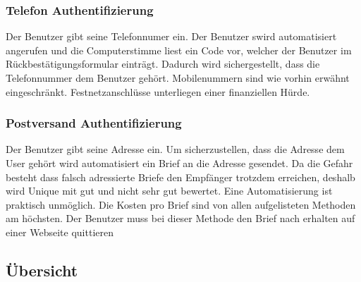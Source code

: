 \subsubsection{Telefon
Authentifizierung}\label{telefon-authentifizierung}

Der Benutzer gibt seine Telefonnumer ein. Der Benutzer swird
automatisiert angerufen und die Computerstimme liest ein Code vor,
welcher der Benutzer im Rückbestätigungsformular einträgt. Dadurch wird
sichergestellt, dass die Telefonnummer dem Benutzer gehört.
Mobilenummern sind wie vorhin erwähnt eingeschränkt. Festnetzanschlüsse
unterliegen einer finanziellen Hürde.

\subsubsection{Postversand
Authentifizierung}\label{postversand-authentifizierung}

Der Benutzer gibt seine Adresse ein. Um sicherzustellen, dass die
Adresse dem User gehört wird automatisiert ein Brief an die Adresse
gesendet. Da die Gefahr besteht dass falsch adressierte Briefe den
Empfänger trotzdem erreichen, deshalb wird Unique mit gut und nicht sehr
gut bewertet. Eine Automatisierung ist praktisch unmöglich. Die Kosten
pro Brief sind von allen aufgelisteten Methoden am höchsten. Der
Benutzer muss bei dieser Methode den Brief nach erhalten auf einer
Webseite quittieren

\subsection{Übersicht}\label{uxfcbersicht}

